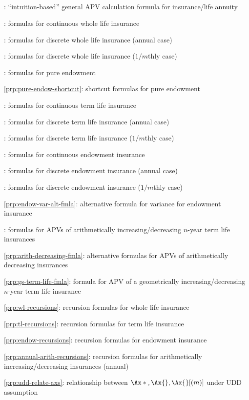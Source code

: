 \subsection*{}
\item {}: ``intuition-based'' general APV calculation formula for insurance/life annuity
\item {}: formulas for continuous whole life insurance
\item {}: formulas for discrete whole life insurance (annual case)
\item {}: formulas for discrete whole life insurance (\(1/m\)thly case)
\item {}: formulas for pure endowment
\item \cref{prp:pure-endow-shortcut}: shortcut formulas for pure endowment
\item {}: formulas for continuous term life insurance
\item {}: formulas for discrete term life insurance (annual case)
\item {}: formulas for discrete term life insurance (\(1/m\)thly case)
\item {}: formulas for continuous endowment insurance
\item {}: formulas for discrete endowment insurance (annual case)
\item {}: formulas for discrete endowment insurance (\(1/m\)thly case)
\item \cref{prp:endow-var-alt-fmla}: alternative formula for variance for endowment insurance
\item {}: formulas for APVs of arithmetically increasing/decreasing \(n\)-year term life insurances
\item \cref{prp:arith-decreasing-fmla}: alternative formulas for APVs of arithmetically decreasing insurances
\item \cref{prp:gs-term-life-fmla}: formula for APV of a geometrically increasing/decreasing \(n\)-year term life insurance
\item \cref{prp:wl-recursions}: recursion formulas for whole life insurance
\item \cref{prp:tl-recursions}: recursion formulas for term life insurance
\item \cref{prp:endow-recursions}: recursion formulas for endowment insurance
\item \cref{prp:annual-arith-recursions}: recursion formulas for arithmetically increasing/decreasing insurances (annual)
\item \cref{prp:udd-relate-axs}: relationship between \(\Ax*{}, \Ax{}, \Ax{}[(m)]\) under UDD assumption
